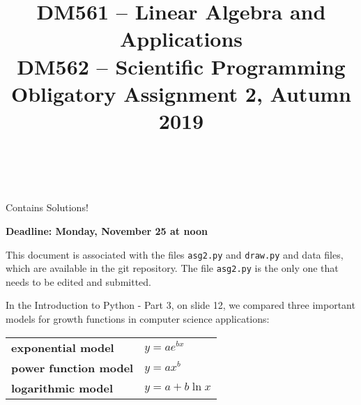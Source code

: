 \documentclass[a4paper,10pt]{article}
\title{%
\begin{flushleft}
  DM561 -- Linear Algebra and Applications\\
  DM562 -- Scientific Programming\\[0.3cm]
{\Large Obligatory Assignment 2, Autumn 2019} %
\\
\hrulefill
\\[-1.8cm]
\end{flushleft}
}
\author{}
\date{}
\begin{document}
\maketitle



\begin{solution}
Contains Solutions!
\end{solution}



\begin{center}
  {\bf Deadline: Monday, November 25 at noon}
\end{center}



This document is associated with the files \lstinline{asg2.py} and
\lstinline{draw.py} and data files, which are available in the git
repository. The file \lstinline{asg2.py} is the only one that needs to be
edited and submitted.

\bigskip

%
%
%
%
%
%
%
%

In the Introduction to Python - Part 3, on slide 12, we compared three
important models for growth functions in computer science applications:

\begin{table}[h]
  \begin{tabular}{ll}
    \textbf{exponential model}&$y=ae^{bx}$\\
    \textbf{power function model}&$y=ax^b$\\
    \textbf{logarithmic model}&$y=a+b\ln x$
  \end{tabular}
\end{table}
\end{document}
